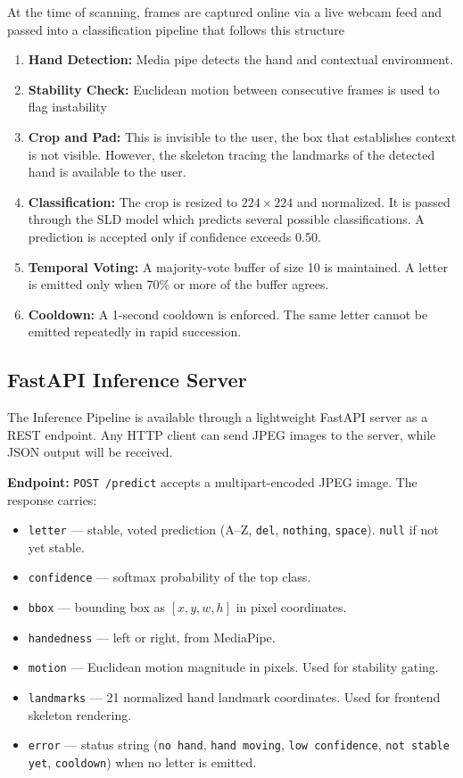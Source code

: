 At the time of scanning, frames are captured online via a live webcam feed and passed into a classification
pipeline that follows this structure
\begin{enumerate}
    \item \textbf{Hand Detection:} Media pipe detects the hand and contextual environment.
    \item \textbf{Stability Check:} Euclidean motion between consecutive frames is used to flag instability
    \item \textbf{Crop and Pad:} This is invisible to the user, the box that establishes context is not visible.
    However, the skeleton tracing the landmarks of the detected hand is available to the user.
    \item \textbf{Classification:} The crop is resized to $224 \times 224$ and normalized. 
    It is passed through the SLD model which predicts several possible 
    classifications. A prediction is accepted only if confidence exceeds 0.50.
    \item \textbf{Temporal Voting:} A majority-vote buffer of size 10 is maintained. 
    A letter is emitted only when 70\% or more of the buffer agrees. 
    \item \textbf{Cooldown:} A 1-second cooldown is enforced. 
    The same letter cannot be emitted repeatedly in rapid succession.
\end{enumerate}

\subsection{FastAPI Inference Server}

The Inference Pipeline is available through a lightweight FastAPI \cite{fastapi} server as a REST endpoint.
Any HTTP client can send JPEG images to the server, while JSON output will be received.

\textbf{Endpoint:} \texttt{POST /predict} accepts a multipart-encoded JPEG image. The response carries:

\begin{itemize}
    \item \texttt{letter} — stable, voted prediction (A--Z, \texttt{del}, \texttt{nothing}, \texttt{space}). \texttt{null} if not yet stable.
    \item \texttt{confidence} — softmax probability of the top class.
    \item \texttt{bbox} — bounding box as $[x, y, w, h]$ in pixel coordinates.
    \item \texttt{handedness} — left or right, from MediaPipe.
    \item \texttt{motion} — Euclidean motion magnitude in pixels. Used for stability gating.
    \item \texttt{landmarks} — 21 normalized hand landmark coordinates. Used for frontend skeleton rendering.
    \item \texttt{error} — status string (\texttt{no hand}, \texttt{hand moving}, \texttt{low confidence}, \texttt{not stable yet}, \texttt{cooldown}) when no letter is emitted.
\end{itemize}

